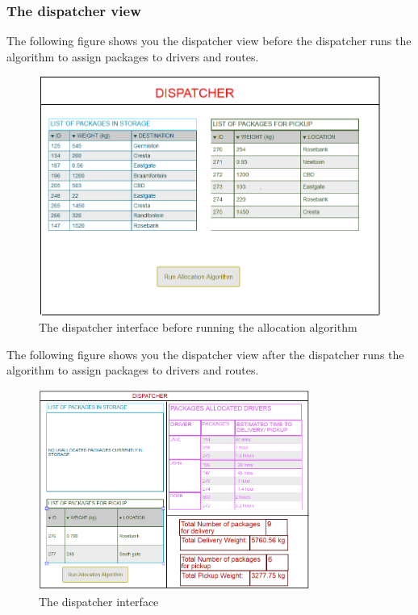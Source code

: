 \documentclass[paper=a4, fontsize=11pt]{scrartcl} %
\numberwithin{equation}{section} %
\numberwithin{figure}{section} %
\numberwithin{table}{section} %
\begin{document}
\subsubsection{The dispatcher view}
The following figure shows you the dispatcher view before the dispatcher runs the algorithm to assign packages to drivers and routes.
\begin{figure}[h!]
\centering
\includegraphics[width=5in]{pictures/dispatcherBefore.png}
\caption{The dispatcher interface before running the allocation algorithm}
\label{DispatcherBefore}
\end{figure}

The following figure shows you the dispatcher view after the dispatcher runs the algorithm to assign packages to drivers and routes.
\begin{figure}[h!]
\centering
\includegraphics[width=3.5in]{pictures/dispatcher.png}
\caption{The dispatcher interface}
\label{Dispatcher}
\end{figure}
\end{document}
